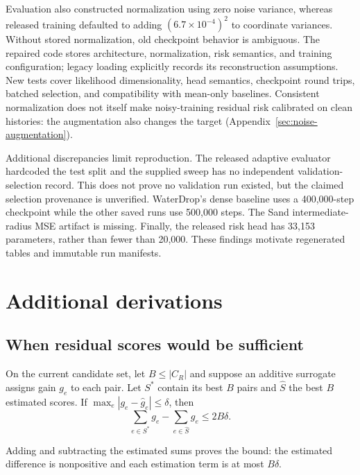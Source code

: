 Evaluation also constructed normalization using zero noise variance, whereas released training defaulted to adding $(6.7\times10^{-4})^2$ to coordinate variances. Without stored normalization, old checkpoint behavior is ambiguous. The repaired code stores architecture, normalization, risk semantics, and training configuration; legacy loading explicitly records its reconstruction assumptions. New tests cover likelihood dimensionality, head semantics, checkpoint round trips, batched selection, and compatibility with mean-only baselines. Consistent normalization does not itself make noisy-training residual risk calibrated on clean histories: the augmentation also changes the target (Appendix~\ref{sec:noise-augmentation}).

Additional discrepancies limit reproduction. The released adaptive evaluator hardcoded the test split and the supplied sweep has no independent validation-selection record. This does not prove no validation run existed, but the claimed selection provenance is unverified. WaterDrop's dense baseline uses a 400,000-step checkpoint while the other saved runs use 500,000 steps. The Sand intermediate-radius MSE artifact is missing. Finally, the released risk head has 33,153 parameters, rather than fewer than 20,000. These findings motivate regenerated tables and immutable run manifests.


\section{Additional derivations}
\subsection{When residual scores would be sufficient}
\label{sec:allocation-score-conditions}
\begin{proposition}
On the current candidate set, let $B\le |C_R|$ and suppose an additive surrogate assigns gain $g_e$ to each pair. Let $S^*$ contain its best $B$ pairs and $\widehat S$ the best $B$ estimated scores. If $\max_e|g_e-\widehat g_e|\le\delta$, then
\begin{equation}
 \sum_{e\in S^*}g_e-\sum_{e\in\widehat S}g_e\le2B\delta.
 \label{eq:regret}
\end{equation}
\end{proposition}
Adding and subtracting the estimated sums proves the bound: the estimated difference is nonpositive and each estimation term is at most $B\delta$.

